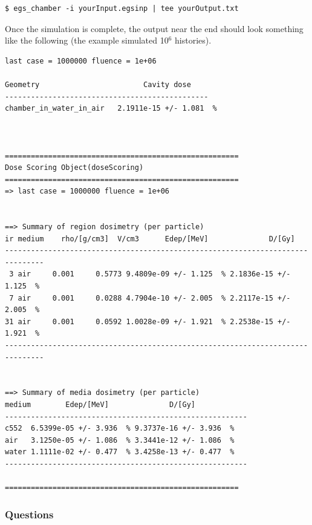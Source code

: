 \documentclass[12pt,twoside]{article}
\begin{document}
\begin{lstlisting}
$ egs_chamber -i yourInput.egsinp | tee yourOutput.txt
\end{lstlisting}

Once the simulation is complete, the output near the end should look something
like the following (the example simulated 10$^6$ histories).

{\scriptsize
\begin{lstlisting}[language={},backgroundcolor=\color{white}]
 last case = 1000000 fluence = 1e+06

Geometry                        Cavity dose
-----------------------------------------------
chamber_in_water_in_air   2.1911e-15 +/- 1.081  %



======================================================
Dose Scoring Object(doseScoring)
======================================================
=> last case = 1000000 fluence = 1e+06


==> Summary of region dosimetry (per particle)
ir medium    rho/[g/cm3]  V/cm3      Edep/[MeV]              D/[Gy]
-------------------------------------------------------------------------------
 3 air     0.001     0.5773 9.4809e-09 +/- 1.125  % 2.1836e-15 +/- 1.125  %
 7 air     0.001     0.0288 4.7904e-10 +/- 2.005  % 2.2117e-15 +/- 2.005  %
31 air     0.001     0.0592 1.0028e-09 +/- 1.921  % 2.2538e-15 +/- 1.921  %
-------------------------------------------------------------------------------


==> Summary of media dosimetry (per particle)
medium        Edep/[MeV]              D/[Gy]
--------------------------------------------------------
c552  6.5399e-05 +/- 3.936  % 9.3737e-16 +/- 3.936  %
air   3.1250e-05 +/- 1.086  % 3.3441e-12 +/- 1.086  %
water 1.1111e-02 +/- 0.477  % 3.4258e-13 +/- 0.477  %
--------------------------------------------------------

======================================================
\end{lstlisting}
}


\subsubsection{Questions}
\end{document}
